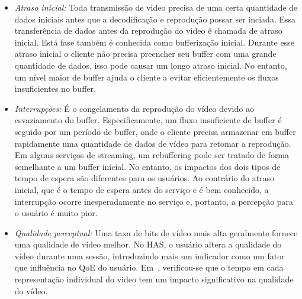 
\begin{itemize}
\vspace{-0.05cm}
\item \textit{Atraso inicial:} Toda transmissão de video precisa de uma certa quantidade de dados iniciais antes que a decodificação e reprodução possar ser inciada. Essa transferência de dados antes da reprodução do video é chamada de atraso inicial. Está fase também é conhecida como bufferização inicial. Durante esse atraso inicial o cliente não precisa preencher seu buffer com uma grande quantidade de dados, isso pode causar um longo atraso inicial. No entanto, um nível maior de buffer ajuda o cliente a evitar eficientemente os fluxos insuficientes no buffer.
\vspace{-0.05cm}
\item \textit{Interrupções:} É o congelamento da reprodução do vídeo devido ao esvaziamento do buffer. Especificamente, um fluxo insuficiente de buffer é seguido por um período de buffer, onde o cliente precisa armazenar em buffer rapidamente uma quantidade de dados de vídeo para retomar a reprodução. 
Em alguns serviços de streaming, um rebuffering pode ser tratado de forma semelhante a um buffer inicial. No entanto, os impactos dos dois tipos de tempo de espera são diferentes para os usuários. Ao contrário do atraso inicial, que é o tempo de espera antes do serviço e é bem conhecido, a interrupção ocorre inesperadamente no serviço e, portanto, a percepção para o usuário é muito pior.%
\vspace{-0.05cm}
\item \textit{Qualidade perceptual:}
Uma taxa de bits de vídeo mais alta geralmente fornece uma qualidade de vídeo melhor. 
No HAS, o usuário altera a qualidade do vídeo durante uma sessão, introduzindo mais um indicador como um fator que influência no QoE do usuário. 
Em~\cite{HoBfeld2014QoMEX}, verificou-se que o tempo em cada representação individual do video tem um impacto significativo na qualidade do vídeo.

\end{itemize}
